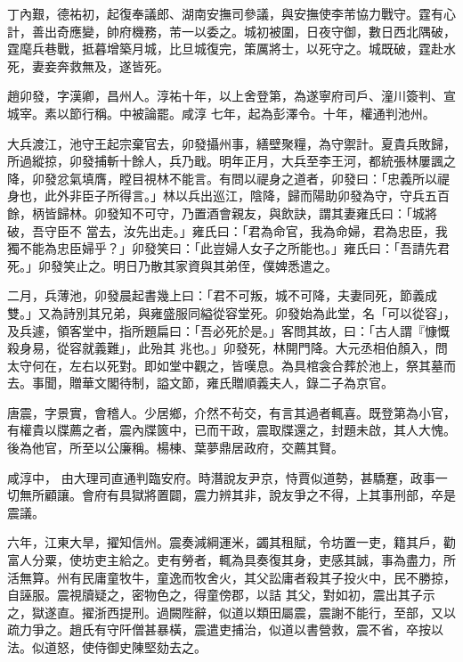 \begin{pinyinscope}
 丁內艱，德祐初，起復奉議郎、湖南安撫司參議，與安撫使李芾協力戰守。霆有心計，善出奇應變，帥府機務，芾一以委之。城初被圍，日夜守御，數日西北隅破，霆麾兵巷戰，抵暮增築月城，比旦城復完，策厲將士，以死守之。城既破，霆赴水死，妻妾奔救無及，遂皆死。



 趙卯發，字漢卿，昌州人。淳祐十年，以上舍登第，為遂寧府司戶、潼川簽判、宣城宰。素以節行稱。中被論罷。咸淳
 七年，起為彭澤令。十年，權通判池州。



 大兵渡江，池守王起宗棄官去，卯發攝州事，繕壁聚糧，為守禦計。夏貴兵敗歸，所過縱掠，卯發捕斬十餘人，兵乃戢。明年正月，大兵至李王河，都統張林屢諷之降，卯發忿氣填膺，瞠目視林不能言。有問以禔身之道者，卯發曰：「忠義所以禔身也，此外非臣子所得言。」林以兵出巡江，陰降，歸而陽助卯發為守，守兵五百餘，柄皆歸林。卯發知不可守，乃置酒會親友，與飲訣，謂其妻雍氏曰：「城將破，吾守臣不
 當去，汝先出走。」雍氏曰：「君為命官，我為命婦，君為忠臣，我獨不能為忠臣婦乎？」卯發笑曰：「此豈婦人女子之所能也。」雍氏曰：「吾請先君死。」卯發笑止之。明日乃散其家資與其弟侄，僕婢悉遣之。



 二月，兵薄池，卯發晨起書幾上曰：「君不可叛，城不可降，夫妻同死，節義成雙。」又為詩別其兄弟，與雍盛服同縊從容堂死。卯發始為此堂，名「可以從容」，及兵遽，領客堂中，指所題扁曰：「吾必死於是。」客問其故，曰：「古人謂『慷慨殺身易，從容就義難」，此殆其
 兆也。」卯發死，林開門降。大元丞相伯顏入，問太守何在，左右以死對。即如堂中觀之，皆嘆息。為具棺衾合葬於池上，祭其墓而去。事聞，贈華文閣待制，謚文節，雍氏贈順義夫人，錄二子為京官。



 唐震，字景實，會稽人。少居鄉，介然不茍交，有言其過者輒喜。既登第為小官，有權貴以牒薦之者，震內牒篋中，已而干政，震取牒還之，封題未啟，其人大愧。後為他官，所至以公廉稱。楊棟、葉夢鼎居政府，交薦其賢。



 咸淳中，
 由大理司直通判臨安府。時潛說友尹京，恃賈似道勢，甚驕蹇，政事一切無所顧讓。會府有具獄將置闢，震力辨其非，說友爭之不得，上其事刑部，卒是震議。



 六年，江東大旱，擢知信州。震奏減綱運米，蠲其租賦，令坊置一吏，籍其戶，勸富人分粟，使坊吏主給之。吏有勞者，輒為具奏復其身，吏感其誠，事為盡力，所活無算。州有民庸童牧牛，童逸而牧舍火，其父訟庸者殺其子投火中，民不勝掠，自誣服。震視牘疑之，密物色之，得童傍郡，以詰
 其父，對如初，震出其子示之，獄遂直。擢浙西提刑。過闕陛辭，似道以類田屬震，震謝不能行，至部，又以疏力爭之。趙氏有守阡僧甚暴橫，震遣吏捕治，似道以書營救，震不省，卒按以法。似道怒，使侍御史陳堅劾去之。




\end{pinyinscope}
